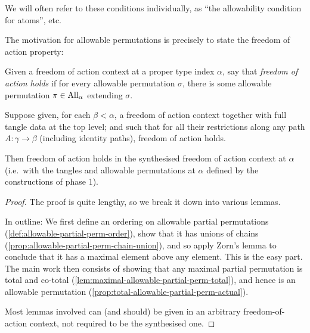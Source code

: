 \begin{definition}
  We will often refer to these conditions individually, as “the allowability condition for atoms”, etc.
\end{definition}

The motivation for allowable permutations is precisely to state the freedom of action property:

\begin{definition}
  \label{def:foa-property}
  \leanok
  Given a freedom of action context at a proper type index $\alpha$, say that \emph{freedom of action holds} if for every allowable permutation $\sigma$, there is some allowable permutation $\pi \in \mathrm{All}_\alpha$ extending $\sigma$.
\end{definition}

\begin{theorem}
  \label{thm:foa-propagates}
  \leanok
  Suppose given, for each $\beta < \alpha$, a freedom of action context together with full tangle data at the top level; and such that for all their restrictions along any path $A : \gamma \to \beta$ (including identity paths), freedom of action holds.

  Then freedom of action holds in the synthesised freedom of action context at $\alpha$ (i.e.\ with the tangles and allowable permutations at $\alpha$ defined by the constructions of phase 1).
\end{theorem}

\begin{proof}
  \leanok
  The proof is quite lengthy, so we break it down into various lemmas.

  In outline: We first define an ordering on allowable partial permutations (\cref{def:allowable-partial-perm-order}), show that it has unions of chains (\cref{prop:allowable-partial-perm-chain-union}), and so apply Zorn’s lemma to conclude that it has a maximal element above any element.  This is the easy part.  The main work then consists of showing that any maximal partial permutation is total and co-total (\cref{lem:maximal-allowable-partial-perm-total}), and hence is an allowable permutation (\cref{prop:total-allowable-partial-perm-actual}).

  Most lemmas involved can (and should) be given in an arbitrary freedom-of-action context, not required to be the synthesised one.
\end{proof}

